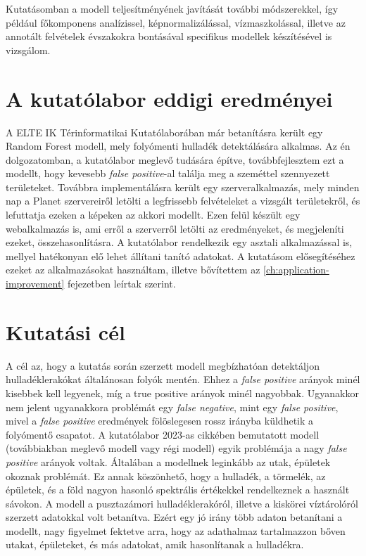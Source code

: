 Kutatásomban a modell teljesítményének javítását további módszerekkel, így például főkomponens analízissel, képnormalizálással, vízmaszkolással, illetve az annotált felvételek évszakokra bontásával specifikus modellek készítésével is vizsgálom.

\section{A kutatólabor eddigi eredményei}

A ELTE IK Térinformatikai Kutatólaborában már betanításra került egy Random Forest modell, mely folyómenti hulladék detektálására alkalmas. Az én dolgozatomban, a kutatólabor meglevő tudására építve, továbbfejlesztem ezt a modellt, hogy kevesebb \textit{false positive}-al találja meg a szeméttel szennyezett területeket. Továbbra implementálásra került egy szerveralkalmazás, mely minden nap a Planet szervereiről letölti a legfrissebb felvételeket a vizsgált területekről, és lefuttatja ezeken a képeken az akkori modellt. Ezen felül készült egy webalkalmazás is, ami erről a szerverről letölti az eredményeket, és megjeleníti ezeket, összehasonlításra. A kutatólabor rendelkezik egy asztali alkalmazással is, mellyel hatékonyan elő lehet állítani tanító adatokat. A kutatásom elősegítéséhez ezeket az alkalmazásokat használtam, illetve bővítettem az \ref{ch:application-improvement} fejezetben leírtak szerint.

\section{Kutatási cél}
\label{ch:goals}

A cél az, hogy a kutatás során szerzett modell megbízhatóan detektáljon hulladéklerakókat általánosan folyók mentén. Ehhez a \textit{false positive} arányok minél kisebbek kell legyenek, míg a true positive arányok minél nagyobbak. Ugyanakkor nem jelent ugyanakkora problémát egy \textit{false negative}, mint egy \textit{false positive}, mivel a \textit{false positive} eredmények fölöslegesen rossz irányba küldhetik a folyómentő csapatot. 
A kutatólabor 2023-as cikkében bemutatott modell (továbbiakban meglevő modell vagy régi modell) \cite{magyar2023} egyik problémája a nagy \textit{false positive} arányok voltak. Általában a modellnek leginkább az utak, épületek okoznak problémát. Ez annak köszönhető, hogy a hulladék, a törmelék, az épületek, és a föld nagyon hasonló spektrális értékekkel rendelkeznek a használt sávokon. A modell a pusztazámori hulladéklerakóról, illetve a kiskörei víztárolóról szerzett adatokkal volt betanítva. Ezért egy jó irány több adaton betanítani a modellt, nagy figyelmet fektetve arra, hogy az adathalmaz tartalmazzon bőven utakat, épületeket, és más adatokat, amik hasonlítanak a hulladékra. 


